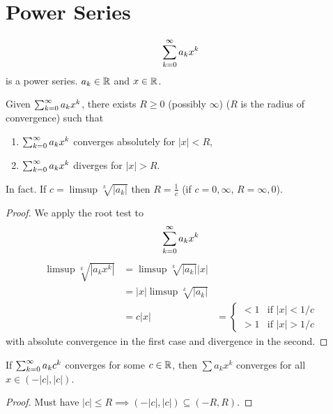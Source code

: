 \chapter{Power Series}\label{cha:powerseries}

\begin{definition}\label{def:powerseries}
    \[
    \sum_{k = 0}^{\infty} a_kx ^ k
    \]
    is a power series.
    $a_k \in \mathbb{R}$ and $x \in \mathbb{R}$.
\end{definition}

\begin{theorem}\label{thm:powseries_cauchyhadamard}
    Given $\sum_{k = 0}^{\infty} a_kx ^ k$,
    there exists $R \geq 0$
    (possibly $\infty$)
    ($R$ is the radius of convergence)
    such that
    \begin{enumerate}[label = (\roman*)]
        \item $\sum_{k = 0}^{\infty} a_kx ^ k$ converges absolutely for $|x| < R$,

        \item $\sum_{k = 0}^{\infty} a_kx ^ k$ diverges for $|x| > R$.
    \end{enumerate}
    In fact.
    If $c = \limsup\sqrt[k]{|a_k|}$ then $R = \frac{1}{c}$
    (if $c = 0, \infty$,
    $R = \infty, 0$).   
\end{theorem}
\begin{proof}
    We apply the root test to
    \[
    \sum_{k = 0}^{\infty} a_kx ^ k
    \]
    \begin{align*}
        \limsup\sqrt[k]{|a_kx ^ k|} &= \limsup\sqrt[k]{|a_k|}|x| \\
        &= |x|\limsup\sqrt[k]{|a_k|} \\
        &= c|x| &= \begin{cases}
            < 1 & \text{if } |x| < 1 / c \\
            > 1 & \text{if } |x| > 1 / c
        \end{cases}
    \end{align*}
    with absolute convergence in the first case and divergence in the second.
\end{proof}

\begin{corollary}\label{cor:convradius}
    If $\sum_{k = 0}^{\infty} a_kc ^ k$ converges for some $c \in \mathbb{R}$,
    then $\sum a_kx ^ k$ converges for all $x \in (-|c|, |c|)$.
\end{corollary}
\begin{proof}
    Must have $|c| \leq R \implies (-|c|, |c|) \subseteq (-R, R)$.
\end{proof}

